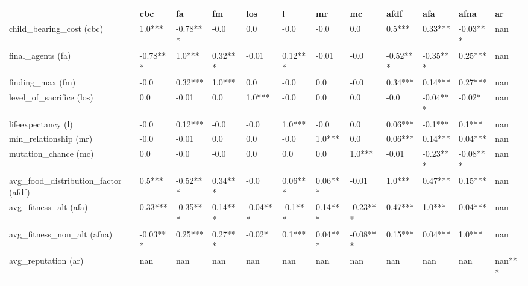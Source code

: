\begin{tabular}{llllllllllll}
    \toprule
    {}                                     & cbc      & fa       & fm      & los      & l       & mr      & mc       & afdf     & afa      & afna     & ar     \\
    \midrule
    child\_bearing\_cost (cbc)             & 1.0***   & -0.78*** & -0.0    & 0.0      & -0.0    & -0.0    & 0.0      & 0.5***   & 0.33***  & -0.03*** & nan    \\
    final\_agents (fa)                     & -0.78*** & 1.0***   & 0.32*** & -0.01    & 0.12*** & -0.01   & -0.0     & -0.52*** & -0.35*** & 0.25***  & nan    \\
    finding\_max (fm)                      & -0.0     & 0.32***  & 1.0***  & 0.0      & -0.0    & 0.0     & -0.0     & 0.34***  & 0.14***  & 0.27***  & nan    \\
    level\_of\_sacrifice (los)             & 0.0      & -0.01    & 0.0     & 1.0***   & -0.0    & 0.0     & 0.0      & -0.0     & -0.04*** & -0.02*   & nan    \\
    lifeexpectancy (l)                     & -0.0     & 0.12***  & -0.0    & -0.0     & 1.0***  & -0.0    & 0.0      & 0.06***  & -0.1***  & 0.1***   & nan    \\
    min\_relationship (mr)                 & -0.0     & -0.01    & 0.0     & 0.0      & -0.0    & 1.0***  & 0.0      & 0.06***  & 0.14***  & 0.04***  & nan    \\
    mutation\_chance (mc)                  & 0.0      & -0.0     & -0.0    & 0.0      & 0.0     & 0.0     & 1.0***   & -0.01    & -0.23*** & -0.08*** & nan    \\
    avg\_food\_distribution\_factor (afdf) & 0.5***   & -0.52*** & 0.34*** & -0.0     & 0.06*** & 0.06*** & -0.01    & 1.0***   & 0.47***  & 0.15***  & nan    \\
    avg\_fitness\_alt (afa)                & 0.33***  & -0.35*** & 0.14*** & -0.04*** & -0.1*** & 0.14*** & -0.23*** & 0.47***  & 1.0***   & 0.04***  & nan    \\
    avg\_fitness\_non\_alt (afna)          & -0.03*** & 0.25***  & 0.27*** & -0.02*   & 0.1***  & 0.04*** & -0.08*** & 0.15***  & 0.04***  & 1.0***   & nan    \\
    avg\_reputation (ar)                   & nan      & nan      & nan     & nan      & nan     & nan     & nan      & nan      & nan      & nan      & nan*** \\
    \bottomrule
\end{tabular}
